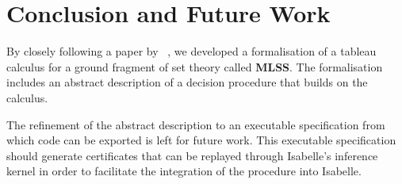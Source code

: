 \documentclass[sigplan,10pt,anonymous,review]{acmart}
\newcommand{\MLSS}{\textbf{MLSS}}
\begin{document}
\section{Conclusion and Future Work}
By closely following a paper by \citeauthor{new_fast_tableau}~\cite{new_fast_tableau}, we developed a formalisation of a tableau calculus for a ground fragment of set theory called \MLSS{}.
The formalisation includes an abstract description of a decision procedure that builds on the calculus.

The refinement of the abstract description to an executable specification from which code can be exported is left for future work.
This executable specification should generate certificates that can be replayed through Isabelle's inference kernel in order to facilitate the integration of the procedure into Isabelle.


\begin{acks}
\end{acks}



\end{document}

